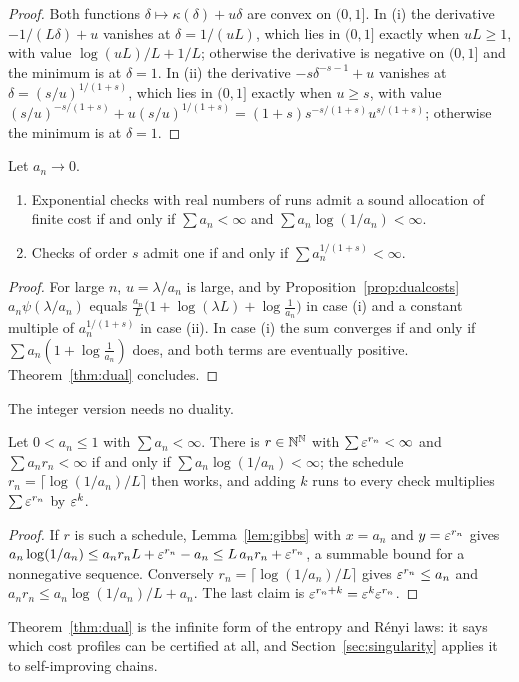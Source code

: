 \begin{proof}
Both functions $\delta\mapsto\kappa(\delta)+u\delta$ are convex on $(0,1]$. In (i) the derivative $-1/(L\delta)+u$ vanishes at $\delta=1/(uL)$, which lies in $(0,1]$ exactly when $uL\ge1$, with value $\log(uL)/L+1/L$; otherwise the derivative is negative on $(0,1]$ and the minimum is at $\delta=1$. In (ii) the derivative $-s\delta^{-s-1}+u$ vanishes at $\delta=(s/u)^{1/(1+s)}$, which lies in $(0,1]$ exactly when $u\ge s$, with value $(s/u)^{-s/(1+s)}+u(s/u)^{1/(1+s)}=(1+s)s^{-s/(1+s)}u^{s/(1+s)}$; otherwise the minimum is at $\delta=1$.
\end{proof}

\begin{corollary}\label{cor:dualcases}
Let $a_{n}\to0$.
\begin{enumerate}[label=\textup{(\roman*)},leftmargin=2.2em,itemsep=1pt]
\item Exponential checks with real numbers of runs admit a sound allocation of finite cost if and only if $\sum a_{n}<\infty$ and $\sum a_{n}\log(1/a_{n})<\infty$.
\item Checks of order $s$ admit one if and only if $\sum a_{n}^{1/(1+s)}<\infty$.
\end{enumerate}
\end{corollary}

\begin{proof}
For large $n$, $u=\lambda/a_{n}$ is large, and by Proposition~\ref{prop:dualcosts} $a_{n}\psi(\lambda/a_{n})$ equals $\frac{a_{n}}L\bigl(1+\log(\lambda L)+\log\frac1{a_{n}}\bigr)$ in case (i) and a constant multiple of $a_{n}^{1/(1+s)}$ in case (ii). In case (i) the sum converges if and only if $\sum a_{n}(1+\log\frac1{a_{n}})$ does, and both terms are eventually positive. Theorem~\ref{thm:dual} concludes.
\end{proof}

The integer version needs no duality.

\begin{proposition}\label{prop:integer}
Let $0<a_{n}\le1$ with $\sum a_{n}<\infty$. There is $r\in\mathbb{N}^{\mathbb{N}}$ with $\sum\varepsilon^{r_{n}}<\infty$ and $\sum a_{n}r_{n}<\infty$ if and only if $\sum a_{n}\log(1/a_{n})<\infty$; the schedule $r_{n}=\lceil\log(1/a_{n})/L\rceil$ then works, and adding $k$ runs to every check multiplies $\sum\varepsilon^{r_{n}}$ by $\varepsilon^{k}$.
\end{proposition}

\begin{proof}
If $r$ is such a schedule, Lemma~\ref{lem:gibbs} with $x=a_{n}$ and $y=\varepsilon^{r_{n}}$ gives $a_{n}\log(1/a_{n})\le a_{n}r_{n}L+\varepsilon^{r_{n}}-a_{n}\le L\,a_{n}r_{n}+\varepsilon^{r_{n}}$, a summable bound for a nonnegative sequence. Conversely $r_{n}=\lceil\log(1/a_{n})/L\rceil$ gives $\varepsilon^{r_{n}}\le a_{n}$ and $a_{n}r_{n}\le a_{n}\log(1/a_{n})/L+a_{n}$. The last claim is $\varepsilon^{r_{n}+k}=\varepsilon^{k}\varepsilon^{r_{n}}$.
\end{proof}

Theorem~\ref{thm:dual} is the infinite form of the entropy and R\'enyi laws: it says which cost profiles can be certified at all, and Section~\ref{sec:singularity} applies it to self-improving chains.
